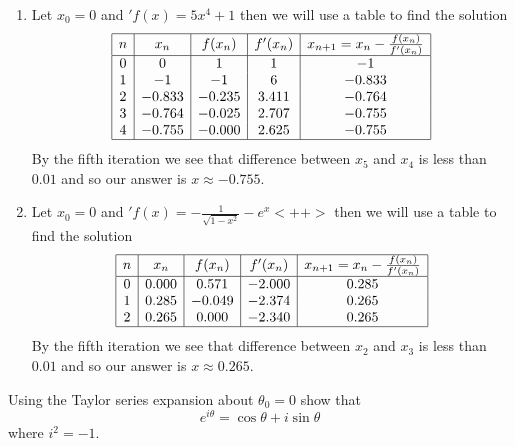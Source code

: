 \documentclass{hwset}
\begin{document}
\begin{enumerate}
	\item \begin{solution} Let $x_0=0$ and $'f(x) = 5x^4 + 1$ then we will use a
	table to find the solution
		\begin{equation*}
			\begin{array}{|c|c|c|c|c|}
				\hline
				n & x_n & f(x_n) & f'(x_n) & x_{n+1}=x_n-\frac{f(x_n)}{f'(x_n)} \\
				\hline
				0 & 0 & 1 & 1 & -1 \\
				1 & -1 & -1 & 6 & -0.833 \\
				2 & -0.833 & -0.235 & 3.411 & -0.764 \\
				3 & -0.764 & -0.025 & 2.707 & -0.755 \\
				4 & -0.755 & -0.000 & 2.625 & -0.755 \\
				\hline
			\end{array}
		\end{equation*}
		By the fifth iteration we see that difference between $x_5$ and $x_4$ is
		less than $0.01$ and so	our answer is $x\approx -0.755$.
	\end{solution}
	\item \begin{solution} Let $x_0=0$ and $'f(x) = -\frac{1}{\sqrt{1-x^2}} -
	e^x<++>$ then we will use a table to find the solution
		\begin{equation*}
			\begin{array}{|c|c|c|c|c|}
				\hline
				n & x_n & f(x_n) & f'(x_n) & x_{n+1}=x_n-\frac{f(x_n)}{f'(x_n)} \\
				\hline
				0 & 0.000 & 0.571 & -2.000 & 0.285 \\
				1 & 0.285 & -0.049 & -2.374 & 0.265 \\
				2 & 0.265 & 0.000 & -2.340 & 0.265 \\
				\hline
			\end{array}
		\end{equation*}
		By the fifth iteration we see that difference between $x_2$ and $x_3$ is
		less than $0.01$ and so	our answer is $x\approx 0.265$.
	\end{solution}
\end{enumerate}

\begin{problem}[3.]
	Using the Taylor series expansion about $\theta_0 = 0$ show that 
	\begin{equation*}
		e^{i \theta} = \cos \theta + i \sin \theta
	\end{equation*}
	where $i^2 = -1$. 
\end{problem}
\end{document}

